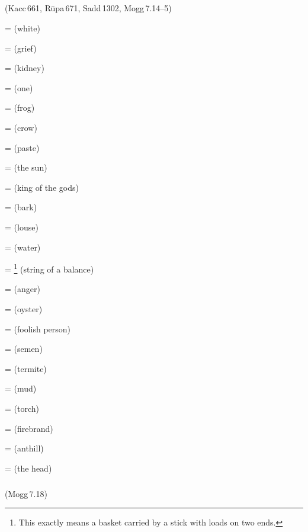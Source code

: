 \subparagraph*{} (Kacc\,661, R\=upa\,671, Sadd\,1302, Mogg\,7.14--5)\label{pacckx:ka2}

 =  (white)\par
{} =  (grief)\par
{} =  (kidney)\par
{} =  (one)\par
{} =  (frog)\par
{} =  (crow)\par
{} =  (paste)\par
{} =  (the sun)\par
{} =  (king of the gods)\par
{} =  (bark)\par
{} =  (louse)\par
{} =  (water)\par
{} = \footnote{This exactly means a basket carried by a stick with loads on two ends.} (string of a balance)\par
{} =  (anger)\par
{} =  (oyster)\par
{} =  (foolish person)\par
{} =  (semen)\par
{} =  (termite)\par
{} =  (mud)\par
{} =  (torch)\par
{} =  (firebrand)\par
{} =  (anthill)\par
{} =  (the head)\par

\subparagraph*{} (Mogg\,7.18)\label{pacckx:aka}

